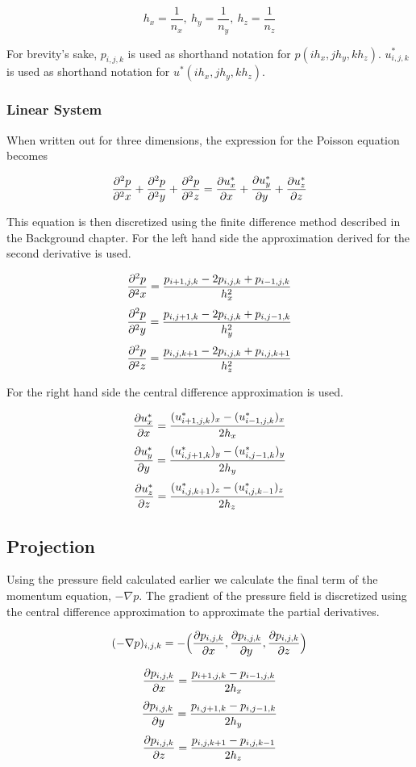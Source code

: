 $$ h_x = \frac{1}{n_x}, ~ h_y = \frac{1}{n_y}, ~ h_z = \frac{1}{n_z} $$

For brevity's sake, $p_{i, j, k}$ is used as shorthand notation for 
$p(ih_x, jh_y, kh_z)$. $u^*_{i, j, k}$ is used as shorthand notation for
$u^*(ih_x, jh_y, kh_z)$.

\subsubsection{Linear System}

When written out for three dimensions, the expression for the Poisson equation
becomes

$$ \frac{\partial^2 p}{\partial^2 x} + \frac{\partial^2 p}{\partial^2 y} + \frac{\partial^2 p}{\partial^2 z} = \frac{\partial u^*_x}{\partial x} + \frac{\partial u^*_y}{\partial y} + \frac{\partial u^*_z}{\partial z} $$

This equation is then discretized using the finite difference method described
in the Background chapter. For the left hand side the approximation derived for 
the second derivative is used.

$$ \frac{\partial^2 p}{\partial^2 x} = \frac{p_{i+1, j, k} - 2p_{i, j, k} + p_{i-1, j, k}}{h_x^2} $$
$$ \frac{\partial^2 p}{\partial^2 y} = \frac{p_{i, j+1, k} - 2p_{i, j, k} + p_{i, j-1, k}}{h_y^2} $$
$$ \frac{\partial^2 p}{\partial^2 z} = \frac{p_{i, j, k+1} - 2p_{i, j, k} + p_{i, j, k+1}}{h_z^2} $$

For the right hand side the central difference approximation is used.

$$ \frac{\partial u^*_x}{\partial x} = \frac{(u^*_{i+1, j, k})_x - (u^*_{i-1, j, k})_x}{2h_x} $$
$$ \frac{\partial u^*_y}{\partial y} = \frac{(u^*_{i, j+1, k})_y - (u^*_{i, j-1, k})_y}{2h_y} $$
$$ \frac{\partial u^*_z}{\partial z} = \frac{(u^*_{i, j, k+1})_z - (u^*_{i, j, k-1})_z}{2h_z} $$

\subsection{Projection}

Using the pressure field calculated earlier we calculate the final term of the 
momentum equation, $-\nabla p$. The gradient of the pressure field is discretized 
using the central difference approximation to approximate the partial derivatives.

$$ (-\nabla p)_{i,j,k} = -\Big( \frac{\partial p_{i,j,k}}{\partial x}, \frac{\partial p_{i,j,k}}{\partial y}, \frac{\partial p_{i,j,k}}{\partial z} \Big) $$

$$ \frac{\partial p_{i,j,k}}{\partial x} = \frac{p_{i+1,j,k} - p_{i-1,j,k}}{2h_x} $$
$$ \frac{\partial p_{i,j,k}}{\partial y} = \frac{p_{i,j+1,k} - p_{i,j-1,k}}{2h_y} $$
$$ \frac{\partial p_{i,j,k}}{\partial z} = \frac{p_{i,j,k+1} - p_{i,j,k-1}}{2h_z} $$

